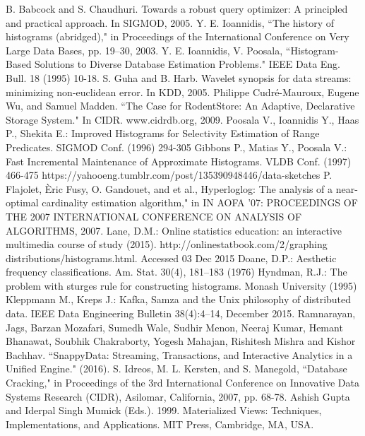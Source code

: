 \documentclass[10pt, conference, compsocconf]{IEEEtran}
\begin{document}
\begin{thebibliography}{1}
B. Babcock and S. Chaudhuri. Towards a robust query optimizer: A principled and practical approach. In SIGMOD, 2005.
Y. E. Ioannidis, ``The history of histograms (abridged)," in Proceedings of the International Conference on Very Large Data Bases, pp. 19–30, 2003.
Y. E. Ioannidis, V. Poosala, ``Histogram-Based Solutions to
Diverse Database Estimation Problems." IEEE Data Eng. Bull. 18 (1995) 10-18.
S. Guha and B. Harb. Wavelet synopsis for data streams: minimizing non-euclidean error. In KDD, 2005.
Philippe Cudré-Mauroux, Eugene Wu, and Samuel Madden. ``The Case for RodentStore: An Adaptive, Declarative Storage System." In CIDR. www.cidrdb.org, 2009.
Poosala V., Ioannidis Y., Haas P., Shekita E.: Improved Histograms for Selectivity Estimation of Range Predicates. SIGMOD Conf. (1996) 294-305
Gibbons P., Matias Y., Poosala V.: Fast Incremental Maintenance of Approximate Histograms. VLDB Conf. (1997) 466-475
https://yahooeng.tumblr.com/post/135390948446/data-sketches
P. Flajolet, \`{E}ric Fusy, O. Gandouet, and et al., Hyperloglog: The analysis of a near-optimal cardinality estimation algorithm," in IN AOFA '07: PROCEEDINGS OF THE 2007 INTERNATIONAL CONFERENCE ON ANALYSIS OF ALGORITHMS, 2007.
Lane, D.M.: Online statistics education: an interactive multimedia course of study (2015). http://onlinestatbook.com/2/graphing distributions/histograms.html. Accessed 03 Dec 2015
Doane, D.P.: Aesthetic frequency classifications. Am. Stat. 30(4), 181–183 (1976)
Hyndman, R.J.: The problem with sturges rule for constructing histograms. Monash University (1995)
Kleppmann M., Kreps J.: Kafka, Samza and the Unix philosophy of distributed data. IEEE Data Engineering Bulletin 38(4):4–14, December 2015.
Ramnarayan, Jags, Barzan Mozafari, Sumedh Wale, Sudhir Menon, Neeraj Kumar, Hemant Bhanawat, Soubhik Chakraborty, Yogesh Mahajan, Rishitesh Mishra and Kishor Bachhav. ``SnappyData: Streaming, Transactions, and Interactive Analytics in a Unified Engine." (2016).
S. Idreos, M. L. Kersten, and S. Manegold, ``Database Cracking," in Proceedings of the 3rd International Conference on Innovative Data Systems Research (CIDR), Asilomar, California, 2007, pp. 68-78.
Ashish Gupta and Iderpal Singh Mumick (Eds.). 1999. Materialized Views: Techniques, Implementations, and Applications. MIT Press, Cambridge, MA, USA.
\end{thebibliography}
\end{document}
